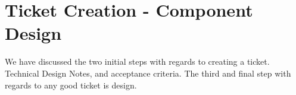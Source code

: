 \maketitle{}
\section{ Ticket Creation - Component Design }
We have discussed the two initial steps with regards to creating a ticket.
Technical Design Notes, and acceptance criteria. The third and final step
with regards to any good ticket is design.

